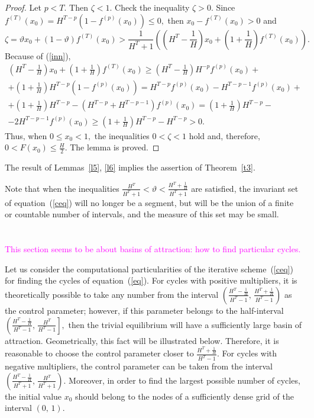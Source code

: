 \documentclass[12pt,a4paper]{amsart}
\begin{document}
\begin{proof}
Let $p<T.$ Then $\zeta < 1.$ Check the inequality $\zeta > 0.$ Since 
$f^{(T)}(x_0) = H^{T-p} \left(1 - f^{(p)}(x_0)\right) \leq 0,$ then $x_0 - f^{(T)}(x_0) > 0$ and
 $$
\zeta=\vartheta x_0 + (1-\vartheta)f^{(T)}(x_0) > 
\frac{1}{H^T + 1} \left ( \left(H^T - \frac{1}{H}\right)x_0 + \left(1 + \frac{1}{H}\right) f^{(T)}(x_0) \right).
$$
Because of (\ref{inn}), 
\begin{gather*}
\left(H^T - \frac{1}{H}\right)x_0 + \left(1 + \frac{1}{H}\right) f^{(T)}(x_0) \geq 
\left(H^T - \frac{1}{H}\right) H^{-p} f^{(p)}(x_0) + \\
+ \left(1 + \frac{1}{H}\right) H^{T-p} \left(1- f^{(p)}(x_0)\right) = H^{T-p} f^{(p)}(x_0) - H^{T-p-1} f^{(p)}(x_0) +\\
+ \left(1 + \frac{1}{H}\right) H^{T-p} - \left(H^{T-p}+H^{T-p-1}\right)f^{(p)}(x_0) = \left(1 + \frac{1}{H}\right) H^{T-p} - \\
- 2 H^{T-p-1}f^{(p)}(x_0) \geq \left(1 + \frac{1}{H}\right) H^{T-p} - H^{T-p} >0.
\end{gather*}
Thus, when $0 \leq x_0 < 1,$ the inequalities $0<\zeta<1$ hold and, therefore, $0 < F(x_0) \leq \frac{H}{2}.$ 
The lemma is proved. 
\end{proof}

The result of Lemmas~\ref{l5}, \ref{l6} implies the assertion of Theorem~\ref{t3}.

Note that when the inequalities $\frac{H^T}{H^T+1}<\vartheta<\frac{H^T+\frac{1}{H}}{H^T+1}$ are satisfied,
the invariant set of equation~(\ref{ceq}) will no longer be a segment, but will be the union of a finite or countable 
number of intervals, and the measure of this set may be small.

\section{}

\textcolor{magenta}{This section seems to be about basins of attraction: how to find particular cycles.}

Let us consider the computational particularities of the iterative scheme~(\ref{ceq}) for finding the cycles of equation~(\ref{eq}).
For cycles with positive multipliers, it is theoretically possible to take any number from the interval 
$\left(\frac{H^T - \frac{1}{H}}{H^T-1},\,\frac{H^T + \frac{1}{H}}{H^T-1}\right)$ as the control parameter;
however, if this parameter belongs to the half-interval $\left(\frac{H^T - \frac{1}{H}}{H^T-1},\,\frac{H^T}{H^T-1}\right],$
then the trivial equilibrium will have a sufficiently large basin of attraction. Geometrically, this fact will be illustrated below. 
Therefore, it is reasonable to choose the control parameter closer to $\frac{H^T + \frac{1}{H}}{H^T-1}.$ For cycles with negative 
multipliers, the control parameter can be taken from the interval 
$\left(\frac{H^T - \frac{1}{H}}{H^T + 1},\,\frac{H^T}{H^T + 1}\right).$ Moreover, in order to find the largest possible 
number of cycles, the initial value $x_0$ should belong to the nodes of a sufficiently dense grid of the interval $(0,\,1).$
\end{document}
